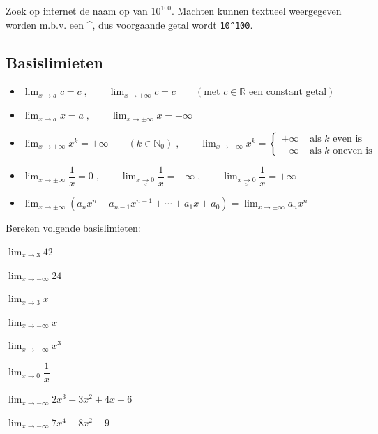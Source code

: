 \documentclass[12pt,twoside,a4paper]{article}
\begin{document}
Zoek op internet de naam op van $10^{100}$. Machten kunnen textueel weergegeven worden m.b.v. een \textasciicircum, dus voorgaande getal wordt \texttt{10\textasciicircum 100}.

\subsection{Basislimieten}

\begin{itemize}
\item $\displaystyle\lim_{x\to a}c=c\;,\qquad\lim_{x\to \pm\infty}c=c\qquad (\mbox{met } c\in\mathbb{R}\mbox{ een constant getal})$
\item $\displaystyle\lim_{x\to a}x=a\;,\qquad\lim_{x\to \pm\infty}x=\pm\infty$
\item $\displaystyle\lim_{x\to+\infty}x^k = +\infty\qquad(k\in\mathbb{N}_0)\;,\qquad \displaystyle\lim_{x\to-\infty}x^k = \begin{cases}+\infty &\mbox{ als $k$ even is}\\-\infty &\mbox{ als $k$ oneven is} \end{cases}$
\item $\displaystyle\lim_{x\to\pm\infty}\dfrac{1}{x}=0\;,\qquad\lim_{x\underset{<}{\to}0}\dfrac{1}{x}=-\infty\;,\qquad \displaystyle\lim_{x\underset{>}{\to}0}\dfrac{1}{x}=+\infty$
\item $\displaystyle\lim_{x\to\pm\infty}\left(a_nx^n+a_{n-1}x^{n-1}+\cdots+a_1x+a_0\right) = \lim_{x\to\pm\infty}a_nx^n$
\end{itemize}

\begin{oefening}
  Bereken volgende basislimieten:
  \begin{exlist}{2}
  \item $\displaystyle \lim_{x\to 3}42$
  \item $\displaystyle \lim_{x\to -\infty}24$
  \item $\displaystyle \lim_{x\to 3}x$
  \item $\displaystyle \lim_{x\to -\infty}x$
  \item $\displaystyle \lim_{x\to -\infty}x^3$
  \item $\displaystyle \lim_{x\to 0}\dfrac{1}{x}$
  \item $\displaystyle \lim_{x\to -\infty}2x^3-3x^2+4x-6$
  \item $\displaystyle \lim_{x\to -\infty}7x^4-8x^2-9$
  \end{exlist}
\end{oefening}
\end{document}
